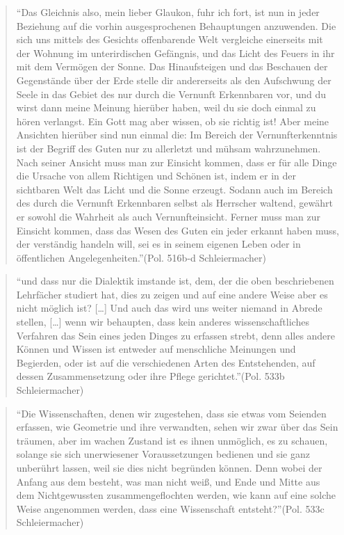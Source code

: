 \documentclass[12pt]{article}
\newcommand*{\zitatblock}[1]{%
    \begin{quote}
    \fontsize{10}{12}\selectfont
    \setlength{\parskip}{1.0em}
    #1
    \end{quote}
}
\begin{document}
\zitatblock{\enquote{Das Gleichnis also, mein lieber Glaukon, fuhr ich fort, ist nun in jeder Beziehung auf die vorhin ausgesprochenen Behauptungen anzuwenden. Die sich uns mittels des Gesichts offenbarende Welt vergleiche einerseits mit der Wohnung im unterirdischen Gefängnis, und das Licht des Feuers in ihr mit dem Vermögen der Sonne. Das Hinaufsteigen und das Beschauen der Gegenstände über der Erde stelle dir andererseits als den Aufschwung der Seele in das Gebiet des nur durch die Vernunft Erkennbaren vor, und du wirst dann meine Meinung hierüber haben, weil du sie doch einmal zu hören verlangst. Ein Gott mag aber wissen, ob sie richtig ist! Aber meine Ansichten hierüber sind nun einmal die: Im Bereich der Vernunfterkenntnis ist der Begriff des Guten nur zu allerletzt und mühsam wahrzunehmen. Nach seiner Ansicht muss man zur Einsicht kommen, dass er für alle Dinge die Ursache von allem Richtigen und Schönen ist, indem er in der sichtbaren Welt das Licht und die Sonne erzeugt. Sodann auch im Bereich des durch die Vernunft Erkennbaren selbst als Herrscher waltend, gewährt er sowohl die Wahrheit als auch Vernunfteinsicht. Ferner muss man zur Einsicht kommen, dass das Wesen des Guten ein jeder erkannt haben muss, der verständig handeln will, sei es in seinem eigenen Leben oder in öffentlichen Angelegenheiten.}(Pol. 516b-d Schleiermacher)}
\zitatblock{\enquote{und dass nur die Dialektik imstande ist, dem, der die oben beschriebenen Lehrfächer studiert hat, dies zu zeigen und auf eine andere Weise aber es nicht möglich ist? [\dots] Und auch das wird uns weiter niemand in Abrede stellen, [\dots] wenn wir behaupten, dass kein anderes wissenschaftliches Verfahren das Sein eines jeden Dinges zu erfassen strebt, denn alles andere Können und Wissen ist entweder auf menschliche Meinungen und Begierden, oder ist auf die verschiedenen Arten des Entstehenden, auf dessen Zusammensetzung oder ihre Pflege gerichtet.}(Pol. 533b Schleiermacher)}
\zitatblock{\enquote{Die Wissenschaften, denen wir zugestehen, dass sie etwas vom Seienden erfassen, wie Geometrie und ihre verwandten, sehen wir zwar über das Sein träumen, aber im wachen Zustand ist es ihnen unmöglich, es zu schauen, solange sie sich unerwiesener Voraussetzungen bedienen und sie ganz unberührt lassen, weil sie dies nicht begründen können. Denn wobei der Anfang aus dem besteht, was man nicht weiß, und Ende und Mitte aus dem Nichtgewussten zusammengeflochten werden, wie kann auf eine solche Weise angenommen werden, dass eine Wissenschaft entsteht?}(Pol. 533c Schleiermacher)}
\end{document}
